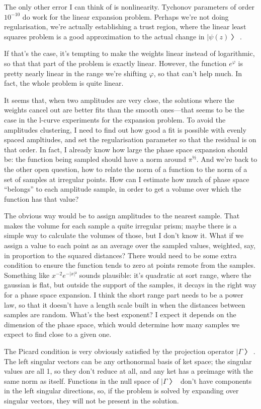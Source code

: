 The only other error I can think of is nonlinearity.  Tychonov parameters of order $10^{-10}$ do work for the linear expansion problem.  Perhaps we're not doing regularisation, we're actually establishing a trust region, where the linear least squares problem is a good approximation to the actual change in $|ψ(z)〉$.

If that's the case, it's tempting to make the weights linear instead of logarithmic, so that that part of the problem is exactly linear.  However, the function $e^φ$ is pretty nearly linear in the range we're shifting $φ$, so that can't help much.  In fact, the whole problem is quite linear.

It seems that, when two amplitudes are very close, the solutions where the weights cancel out are better fits than the smooth ones—that seems to be the case in the l-curve experiments for the expansion problem.  To avoid the amplitudes clustering, I need to find out how good a fit is possible with evenly spaced ampltiudes, and set the regularisation parameter so that the residual is on that order.  In fact, I already know how large the phase space expansion should be: the function being sampled should have a norm around $π^½$.  And we're back to the other open question, how to relate the norm of a function to the norm of a set of samples at irregular points.  How can I estimate how much of phase space “belongs” to each amplitude sample, in order to get a volume over which the function has that value?

The obvious way would be to assign amplitudes to the nearest sample.  That makes the volume for each sample a quite irregular prism; maybe there is a simple way to calculate the volumes of those, but I don't know it.  What if we assign a value to each point as an average over the sampled values, weighted, say, in proportion to the squared distances?  There would need to be some extra condition to ensure the function tends to zero at points remote from the samples.  Something like $x^{-2}e^{-|x|²}$ sounds plausible: it's quadratic at sort range, where the gaussian is flat, but outside the support of the samples, it decays in the right way for a phase space expansion.  I think the short range part needs to be a power law, so that it doesn't have a length scale built in when the distances between samples are random.  What's the best exponent?  I expect it depends on the dimension of the phase space, which would determine how many samples we expect to find close to a given one.

The Picard condition is very obviously satisfied by the projection operator $|Γ〉$.  The left singular vectors can be any orthonormal basis of ket space; the singular values are all 1, so they don't reduce at all, and any ket has a preimage with the same norm as itself.  Functions in the null space of $|Γ〉$ don't have components in the left singular directions, so, if the problem is solved by expanding over singular vectors, they will not be present in the solution. 


